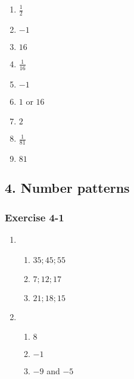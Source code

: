 {\begin{multicols}{3}
\begin{enumerate}[label=\textbf{\arabic*}., noitemsep]
\begin{enumerate}[label=\textbf{(\alph*)}, itemsep=1pt]
    \item $\frac{1}{2}$%
    \item $-1$%
    \item $16$%
    \item $\frac{1}{16}$%
    \item $-1$%
    \item $1$ or $16$%
    \item $2$%
    \item $\frac{1}{81}$%
    \item $81$%
    \end{enumerate}
  \end{enumerate}
\end{multicols}


\subsection* {4. Number patterns}
\begin{multicols}{3}
\subsubsection*{Exercise 4-1} %

\begin{enumerate}[noitemsep, label=\textbf{\arabic*}. ] 
\item %

  \begin{enumerate} [noitemsep, label=\textbf{(\alph*)} ]
  \item $35; 45; 55$ %
  \item $7; 12; 17$%
  \item $21; 18; 15$%
  \end{enumerate}
 \item %
  \begin{enumerate} [noitemsep, label=\textbf{(\alph*)} ]
  \item $8$%
  \item $-1$%
  \item $-9$ and $-5$%
  \end{enumerate}
     

\end{enumerate}
\end{multicols}}
